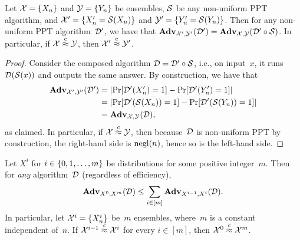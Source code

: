 \documentclass[11pt]{article}
\begin{document}
\begin{lemma}
  \label{lem:composition}
  Let $\mathcal{X} = \{X_{n}\}$ and $\mathcal{Y} = \{Y_{n}\}$ be ensembles, $\mathcal{S}$ be any non-uniform PPT algorithm, and $\mathcal{X}' = \{X'_{n} = \mathcal{S}(X_{n})\}$ and $\mathcal{Y}' = \{Y'_{n} = \mathcal{S}(Y_{n})\}$.
  Then for any non-uniform PPT algorithm~$\mathcal{D}'$, we have that $\mathbf{Adv}_{\mathcal{X}',\mathcal{Y}'}(\mathcal{D}') = \mathbf{Adv}_{\mathcal{X},\mathcal{Y}}(\mathcal{D}' \circ \mathcal{S})$.
  In particular, if $\mathcal{X} \stackrel{c}{\approx} \mathcal{Y}$, then $\mathcal{X}' \stackrel{c}{\approx} \mathcal{Y}'$.
\end{lemma}

\begin{proof}
  Consider the composed algorithm $\mathcal{D} = \mathcal{D}' \circ \mathcal{S}$, i.e., on input~$x$, it runs $\mathcal{D}(\mathcal{S}(x))$ and outputs the same answer.
  By construction, we have that
  \[
    \begin{aligned}
      \mathbf{Adv}_{\mathcal{X}',\mathcal{Y}'}(\mathcal{D}')
      &= \lvert\Pr[\mathcal{D}'(X'_{n})=1] - \Pr[\mathcal{D}'(Y'_{n})=1]\rvert \\
      &= \lvert\Pr[\mathcal{D}'(\mathcal{S}(X_{n}))=1] - \Pr[\mathcal{D}'(\mathcal{S}(Y_{n}))=1]\rvert \\
      &= \mathbf{Adv}_{\mathcal{X},\mathcal{Y}}(\mathcal{D}) ,
    \end{aligned}
  \]
  as claimed.
  In particular, if $\mathcal{X} \stackrel{c}{\approx} \mathcal{Y}$, then because~$\mathcal{D}$ is non-uniform PPT by construction, the right-hand side is $\operatorname{negl}(n)$, hence so is the left-hand side.
\end{proof}

\begin{lemma}
  \label{lem:hybrid}
  Let $X^{i}$ for $i \in \{0, 1, \ldots, m\}$ be distributions for some positive integer~$m$.
  Then for \emph{any} algorithm~$\mathcal{D}$ (regardless of efficiency),
  \[ \mathbf{Adv}_{X^{0},X^{m}}(\mathcal{D}) \leq \sum_{i \in [m]} \mathbf{Adv}_{X^{i-1}, X^{i}}(\mathcal{D}) .
  \]
  In particular, let $\mathcal{X}^{i} = \{X^{i}_{n}\}$ be~$m$ ensembles, where~$m$ is a constant independent of~$n$.
  If $\mathcal{X}^{i-1} \stackrel{c}{\approx} \mathcal{X}^{i}$ for every $i \in [m]$, then $\mathcal{X}^{0} \stackrel{c}{\approx} \mathcal{X}^{m}$.
\end{lemma}
\end{document}

